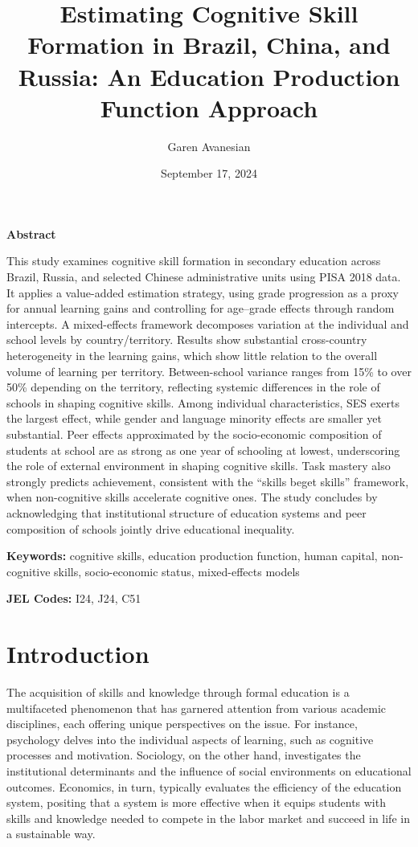 \documentclass[
]{article}
\title{Estimating Cognitive Skill Formation in Brazil, China, and
Russia: An Education Production Function Approach}
\author{Garen Avanesian}
\date{September 17, 2024}
\renewcommand*\contentsname{Table of contents}
\newcommand\contentsname{Table of contents}
\begin{document}
\maketitle

\renewcommand*\contentsname{Table of contents}
{
\hypersetup{linkcolor=}
\setcounter{tocdepth}{3}
\tableofcontents
}

\textbf{Abstract}

This study examines cognitive skill formation in secondary education
across Brazil, Russia, and selected Chinese administrative units using
PISA 2018 data. It applies a value-added estimation strategy, using
grade progression as a proxy for annual learning gains and controlling
for age--grade effects through random intercepts. A mixed-effects
framework decomposes variation at the individual and school levels by
country/territory. Results show substantial cross-country heterogeneity
in the learning gains, which show little relation to the overall volume
of learning per territory. Between-school variance ranges from 15\% to
over 50\% depending on the territory, reflecting systemic differences in
the role of schools in shaping cognitive skills. Among individual
characteristics, SES exerts the largest effect, while gender and
language minority effects are smaller yet substantial. Peer effects
approximated by the socio-economic composition of students at school are
as strong as one year of schooling at lowest, underscoring the role of
external environment in shaping cognitive skills. Task mastery also
strongly predicts achievement, consistent with the ``skills beget
skills'' framework, when non-cognitive skills accelerate cognitive ones.
The study concludes by acknowledging that institutional structure of
education systems and peer composition of schools jointly drive
educational inequality.

\textbf{Keywords:} cognitive skills, education production function,
human capital, non-cognitive skills, socio-economic status,
mixed-effects models

\textbf{JEL Codes:} I24, J24, C51

\newpage

\section{Introduction}\label{introduction}

The acquisition of skills and knowledge through formal education is a
multifaceted phenomenon that has garnered attention from various
academic disciplines, each offering unique perspectives on the issue.
For instance, psychology delves into the individual aspects of learning,
such as cognitive processes and motivation. Sociology, on the other
hand, investigates the institutional determinants and the influence of
social environments on educational outcomes. Economics, in turn,
typically evaluates the efficiency of the education system, positing
that a system is more effective when it equips students with skills and
knowledge needed to compete in the labor market and succeed in life in a
sustainable way.
\end{document}
